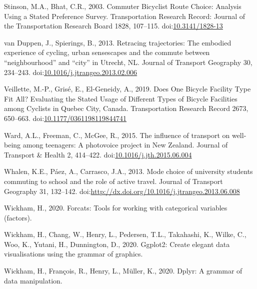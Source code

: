 \documentclass[]{elsarticle} %
\begin{document}
\leavevmode\hypertarget{ref-stinsonCommuterBicyclistRoute2003}{}%
Stinson, M.A., Bhat, C.R., 2003. Commuter Bicyclist Route Choice:
Analysis Using a Stated Preference Survey. Transportation Research
Record: Journal of the Transportation Research Board 1828, 107--115.
doi:\href{https://doi.org/10.3141/1828-13}{10.3141/1828-13}

\leavevmode\hypertarget{ref-vanduppenRetracingTrajectoriesEmbodied2013}{}%
van Duppen, J., Spierings, B., 2013. Retracing trajectories: The
embodied experience of cycling, urban sensescapes and the commute
between ``neighbourhood'' and ``city'' in Utrecht, NL. Journal of
Transport Geography 30, 234--243.
doi:\href{https://doi.org/10.1016/j.jtrangeo.2013.02.006}{10.1016/j.jtrangeo.2013.02.006}

\leavevmode\hypertarget{ref-veilletteDoesOneBicycle2019}{}%
Veillette, M.-P., Grisé, E., El-Geneidy, A., 2019. Does One Bicycle
Facility Type Fit All? Evaluating the Stated Usage of Different Types of
Bicycle Facilities among Cyclists in Quebec City, Canada. Transportation
Research Record 2673, 650--663.
doi:\href{https://doi.org/10.1177/0361198119844741}{10.1177/0361198119844741}

\leavevmode\hypertarget{ref-wardInfluenceTransportWellbeing2015}{}%
Ward, A.L., Freeman, C., McGee, R., 2015. The influence of transport on
well-being among teenagers: A photovoice project in New Zealand. Journal
of Transport \& Health 2, 414--422.
doi:\href{https://doi.org/10.1016/j.jth.2015.06.004}{10.1016/j.jth.2015.06.004}

\leavevmode\hypertarget{ref-whalenModeChoice2013}{}%
Whalen, K.E., Páez, A., Carrasco, J.A., 2013. Mode choice of university
students commuting to school and the role of active travel. Journal of
Transport Geography 31, 132--142.
doi:\href{https://doi.org/http://dx.doi.org/10.1016/j.jtrangeo.2013.06.008}{http://dx.doi.org/10.1016/j.jtrangeo.2013.06.008}

\leavevmode\hypertarget{ref-R-forcats}{}%
Wickham, H., 2020. Forcats: Tools for working with categorical variables
(factors).

\leavevmode\hypertarget{ref-R-ggplot2}{}%
Wickham, H., Chang, W., Henry, L., Pedersen, T.L., Takahashi, K., Wilke,
C., Woo, K., Yutani, H., Dunnington, D., 2020. Ggplot2: Create elegant
data visualisations using the grammar of graphics.

\leavevmode\hypertarget{ref-R-dplyr}{}%
Wickham, H., François, R., Henry, L., Müller, K., 2020. Dplyr: A grammar
of data manipulation.
\end{document}
